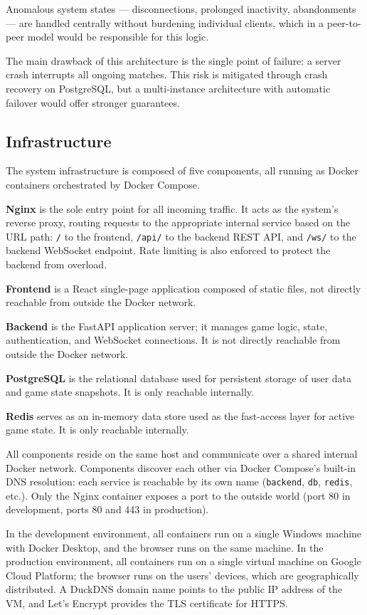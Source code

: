 \documentclass{scrartcl}
\begin{document}
Anomalous system states --- disconnections, prolonged inactivity, abandonments ---
are handled centrally without burdening individual clients,
which in a peer-to-peer model would be responsible for this logic.

The main drawback of this architecture is the single point of failure:
a server crash interrupts all ongoing matches.
This risk is mitigated through crash recovery on PostgreSQL,
but a multi-instance architecture with automatic failover would offer stronger guarantees.

\subsection{Infrastructure}\label{infrastructure}

The system infrastructure is composed of five components, all running as Docker
containers orchestrated by Docker Compose.

\textbf{Nginx} is the sole entry point for all incoming traffic.
It acts as the system's reverse proxy, routing requests to the appropriate
internal service based on the URL path:
\texttt{/} to the frontend,
\texttt{/api/} to the backend REST API,
and \texttt{/ws/} to the backend WebSocket endpoint.
Rate limiting is also enforced to protect the backend from overload.

\textbf{Frontend} is a React single-page application composed of static files,
not directly reachable from outside the Docker network.

\textbf{Backend} is the FastAPI application server; it manages game logic,
state, authentication, and WebSocket connections.
It is not directly reachable from outside the Docker network.

\textbf{PostgreSQL} is the relational database used for persistent storage of
user data and game state snapshots. It is only reachable internally.

\textbf{Redis} serves as an in-memory data store used as the fast-access layer
for active game state. It is only reachable internally.

All components reside on the same host and communicate over a shared internal
Docker network. Components discover each other via Docker Compose's built-in
DNS resolution: each service is reachable by its own name
(\texttt{backend}, \texttt{db}, \texttt{redis}, etc.).
Only the Nginx container exposes a port to the outside world
(port 80 in development, ports 80 and 443 in production).

In the development environment, all containers run on a single Windows machine
with Docker Desktop, and the browser runs on the same machine.
In the production environment, all containers run on a single virtual machine
on Google Cloud Platform; the browser runs on the users' devices,
which are geographically distributed.
A DuckDNS domain name points to the public IP address of the VM,
and Let's Encrypt provides the TLS certificate for HTTPS.
\end{document}

